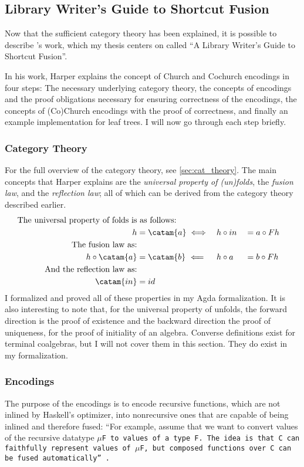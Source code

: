 \subsection{Library Writer's Guide to Shortcut Fusion}\label{sec:libfusion}
Now that the sufficient category theory has been explained, it is possible to describe \cite{Harper2011}'s work, which my thesis centers on called ``A Library Writer's Guide to Shortcut Fusion''.

In his work, Harper explains the concept of Church and Cochurch encodings in four steps:
The necessary underlying category theory, the concepts of encodings and the proof obligations necessary for ensuring correctness of the encodings, the concepts of (Co)Church encodings with the proof of correctness, and finally an example implementation for leaf trees.
I will now go through each step briefly.

\subsubsection{Category Theory}
For the full overview of the category theory, see \autoref{sec:cat_theory}.
The main concepts that Harper explains are the \textit{universal property of (un)folds}, the \textit{fusion law}, and the \textit{reflection law}; all of which can be derived from the category theory described earlier.
\begin{alignat*}{3}
\text{The universal property of folds is}&\text{ as follows:} \\
h &= \catam{a} \iff && h \circ in &&= a \circ F h \\
\text{The fusion law as:} \\
h \circ \catam{a} &= \catam{b}~\Longleftarrow && h \circ a &&= b \circ F h \\
\text{And the reflection law as:} \\
\catam{in} &= id
\end{alignat*}
I formalized and proved all of these properties in my Agda formalization.
It is also interesting to note that, for the universal property of unfolds, the forward direction is the proof of existence and the backward direction the proof of uniqueness, for the proof of initiality of an algebra.
Converse definitions exist for terminal coalgebras, but I will not cover them in this section.
They do exist in my formalization.

\subsubsection{Encodings}\label{sec:obligations}
The purpose of the encodings is to encode recursive functions, which are not inlined by Haskell's optimizer, into nonrecursive ones that are capable of being inlined and therefore fused:
``For example, assume that we want to convert values of the recursive datatype \tt{$\mu$F} to values of a type \tt{F}.  The idea is that \tt{C} can faithfully represent values of \tt{$\mu$F}, but composed functions over \tt{C} can be fused automatically'' \citep{Harper2011}.

